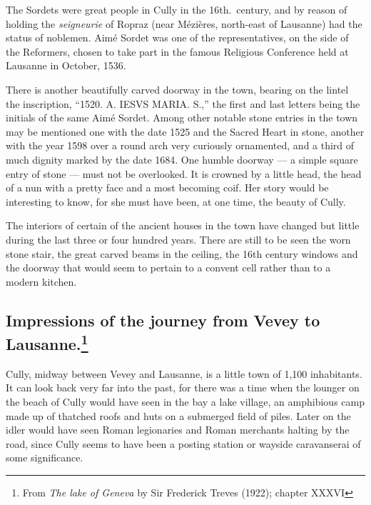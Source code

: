 \documentclass[11pt,a4paper,twocolumn]{article}
\begin{document}
The Sordets were great people in Cully in the 16th.\ century, and by
reason of holding the \emph{seigneurie} of Ropraz (near M\'{e}zi\`{e}res,
north-east of Lausanne) had the status of noblemen. Aim\'{e} Sordet was one
of the representatives, on the side of the Reformers, chosen to take
part in the famous Religious Conference held at Lausanne in October,
1536.

There is another beautifully carved doorway in the town, bearing on the
lintel the inscription, ``1520. A. IESVS MARIA. S.,'' the first and
last letters being the initials of the same Aim\'{e} Sordet. Among other
notable stone entries in the town may be mentioned one with the date
1525 and the Sacred Heart in stone, another with the year 1598 over a
round arch very curiously ornamented, and a third of much dignity
marked by the date 1684. One humble doorway --- a simple square entry
of stone --- must not be overlooked. It is crowned by a little head,
the head of a nun with a pretty face and a most becoming coif. Her
story would be interesting to know, for she must have been, at one
time, the beauty of Cully.

The interiors of certain of the ancient houses in the town have changed
but little during the last three or four hundred years. There are still
to be seen the worn stone stair, the great carved beams in the ceiling,
the 16th century windows and the doorway that would seem to pertain to
a convent cell rather than to a modern kitchen.


\heading

\subsection*{Impressions of the journey from \mbox{Vevey} to Lausanne.\footnote{From
\emph{The lake of Geneva} by Sir Frederick Treves (1922); chapter XXXVI}}

Cully, midway between Vevey and Lausanne, is a little town of 1,100
inhabitants. It can look back very far into the past, for there was a time
when the lounger on the beach of Cully would have seen in the bay a lake
village, an amphibious camp made up of thatched roofs and huts on a submerged
field of piles. Later on the idler would have seen Roman legionaries and
Roman merchants halting by the road, since Cully seems to have been a posting
station or wayside caravanserai of some significance.
\end{document}
